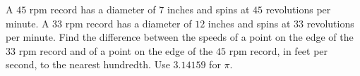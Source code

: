 A $45$ rpm record has a diameter of $7$ inches and spins at $45$ revolutions per minute. A $33$ rpm record has a diameter of $12$ inches and spins at $33$ revolutions per minute. Find the difference between the speeds of a point on the edge of the $33$ rpm record and of a point on the edge of the $45$ rpm record, in feet per second, to the nearest hundredth. Use $3.14159$ for $\pi$.
